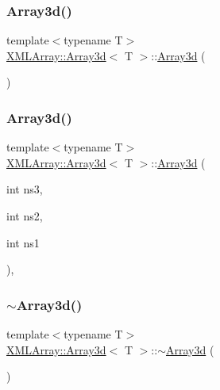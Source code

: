 \subsubsection{\texorpdfstring{Array3d()}{Array3d()}\hspace{0.1cm}{\footnotesize\ttfamily [7/9]}}
{\footnotesize\ttfamily template$<$typename T$>$ \\
\mbox{\hyperlink{classXMLArray_1_1Array3d}{X\+M\+L\+Array\+::\+Array3d}}$<$ T $>$\+::\mbox{\hyperlink{classXMLArray_1_1Array3d}{Array3d}} (\begin{DoxyParamCaption}{ }\end{DoxyParamCaption})\hspace{0.3cm}{\ttfamily [inline]}}

\mbox{\label{classXMLArray_1_1Array3d_ae97f5fabfb023196e45ab6fd53d533d9}} 
\subsubsection{\texorpdfstring{Array3d()}{Array3d()}\hspace{0.1cm}{\footnotesize\ttfamily [8/9]}}
{\footnotesize\ttfamily template$<$typename T$>$ \\
\mbox{\hyperlink{classXMLArray_1_1Array3d}{X\+M\+L\+Array\+::\+Array3d}}$<$ T $>$\+::\mbox{\hyperlink{classXMLArray_1_1Array3d}{Array3d}} (\begin{DoxyParamCaption}\item[{int}]{ns3,  }\item[{int}]{ns2,  }\item[{int}]{ns1 }\end{DoxyParamCaption})\hspace{0.3cm}{\ttfamily [inline]}, {\ttfamily [explicit]}}

\mbox{\label{classXMLArray_1_1Array3d_a8ad71a50d673f74c88d605214a4acbd7}} 
\subsubsection{\texorpdfstring{$\sim$Array3d()}{~Array3d()}\hspace{0.1cm}{\footnotesize\ttfamily [3/3]}}
{\footnotesize\ttfamily template$<$typename T$>$ \\
\mbox{\hyperlink{classXMLArray_1_1Array3d}{X\+M\+L\+Array\+::\+Array3d}}$<$ T $>$\+::$\sim$\mbox{\hyperlink{classXMLArray_1_1Array3d}{Array3d}} (\begin{DoxyParamCaption}{ }\end{DoxyParamCaption})\hspace{0.3cm}{\ttfamily [inline]}}

